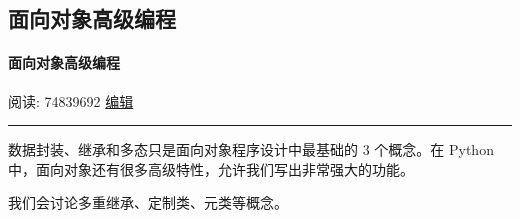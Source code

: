\hypertarget{ux9762ux5411ux5bf9ux8c61ux9ad8ux7ea7ux7f16ux7a0b}{%
\subsection{面向对象高级编程}\label{ux9762ux5411ux5bf9ux8c61ux9ad8ux7ea7ux7f16ux7a0b}}

\hypertarget{ux9762ux5411ux5bf9ux8c61ux9ad8ux7ea7ux7f16ux7a0b-1}{%
\paragraph{面向对象高级编程}\label{ux9762ux5411ux5bf9ux8c61ux9ad8ux7ea7ux7f16ux7a0b-1}}

阅读: 74839692
\href{https://www.liaoxuefeng.com/manage/wiki/wikipage_update?id=1017501628721248}{编辑}

\begin{center}\rule{0.5\linewidth}{0.5pt}\end{center}

数据封装、继承和多态只是面向对象程序设计中最基础的 3 个概念。在 Python
中，面向对象还有很多高级特性，允许我们写出非常强大的功能。

我们会讨论多重继承、定制类、元类等概念。

